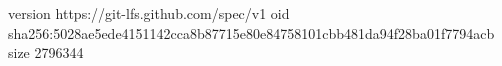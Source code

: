 version https://git-lfs.github.com/spec/v1
oid sha256:5028ae5ede4151142cca8b87715e80e84758101cbb481da94f28ba01f7794acb
size 2796344
